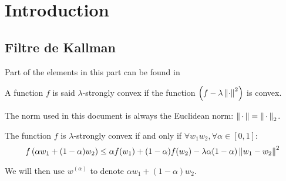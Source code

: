 \documentclass{article}
\begin{document}
\sloppy
{}


\section{Introduction}
\label{sec:introduction}


\subsection{Filtre de Kallman}


Part of the elements in this part can be found in \cite{Hiriart-Urruty_Lemarechal93,Hiriart-Urruty_Lemarechal93b}
\begin{definition}
A function $f$ is said $\lambda$-strongly convex if the function
$\left(f - \lambda \left \lVert \cdot \right \rVert^2\right)$ is convex.
\end{definition}

\begin{remark}
The norm used in this document is always the Euclidean norm: $\left \lVert \,\cdot\, \right \rVert = \left \lVert \,\cdot\, \right \rVert_2$.
\end{remark}


\begin{proposition}
The function $f$ is $\lambda$-strongly convex if and only if $
\forall w_1 w_2, \forall \alpha \in [0,1]:$
\begin{equation}\label{eq:strong}
f\left(\alpha w_1 + (1-\alpha) w_2\right)
\leq
\alpha f(w_1) + (1-\alpha) f(w_2) - \lambda \alpha (1-\alpha) \left \lVert w_1-w_2 \right \rVert^2
\end{equation}
\end{proposition}


We will then use $w^{(\alpha)}$ to denote $\alpha w_1 + (1-\alpha) w_2$.
\end{document}
